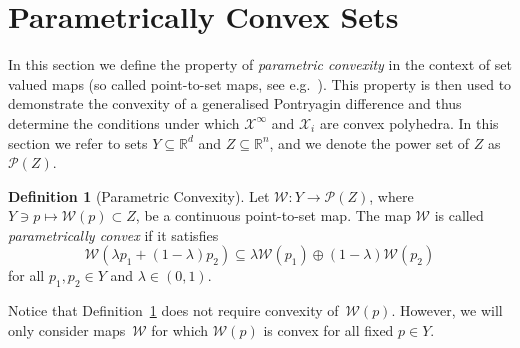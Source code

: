 \documentclass[journal]{IEEEtran}
\newcounter{thmcount}
\theoremstyle{remark}
\theoremstyle{definition}
\newtheorem{defi}[thmcount]{Definition}
\begin{document}
\section{Parametrically Convex Sets}\label{sec:p:convex:sets}
In this section we define the property of \emph{parametric convexity} in the context of set valued maps (so called point-to-set maps, see e.g.~\cite{Hogan:1973}). This property is then used 
to demonstrate the convexity of a generalised Pontryagin difference and thus determine the conditions under which $\mathcal{X}^\infty$ and $\mathcal{X}_i$ are convex polyhedra. 
%
In this section we refer to sets $Y\subseteq\mathbb R^d$ and $Z\subseteq\mathbb R^n$, and we denote the power set of $Z$ as $\mathscr P(Z)$.
%
\begin{defi}[Parametric Convexity]\label{def:parametric:convexity}
Let $\mathcal W:Y\rightarrow \mathscr P(Z)$, where $Y\ni p\mapsto \mathcal W(p) \subset Z$, be a continuous point-to-set map. The map $\mathcal W$ is called \emph{parametrically convex} if it satisfies
%
  \begin{equation}\label{eq:def:parametrically:convex}
  \mathcal W(\lambda p_1 + (1-\lambda)p_2)\subseteq\lambda \mathcal W(p_1) \oplus (1-\lambda) \mathcal W(p_2)
  \end{equation}
%
  for all $p_1,p_2\in Y$ and $\lambda\in (0,1)$.
\end{defi}
%
Notice that Definition~\ref{def:parametric:convexity} does not require convexity of~$\mathcal W(p)$. However, we will only consider maps~$\mathcal W$ for which $\mathcal W(p)$ is convex for all fixed $p\in Y$.
\end{document}
